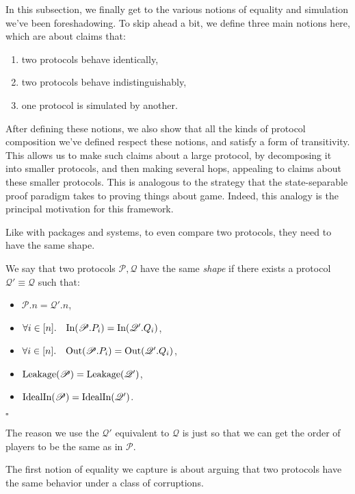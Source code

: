 In this subsection, we finally get to the various notions
of equality and simulation we've been foreshadowing.
To skip ahead a bit, we define three main notions here, which
are about claims that:
\begin{enumerate}
  \item two protocols behave identically,
  \item two protocols behave indistinguishably,
  \item one protocol is simulated by another.
\end{enumerate}
After defining these notions, we also show that all the kinds
of protocol composition we've defined respect these notions,
and satisfy a form of transitivity.
This allows us to make such claims about a large protocol,
by decomposing it into smaller protocols, and then making
several hops, appealing to claims about these smaller protocols.
This is analogous to the strategy that the state-separable proof
paradigm takes to proving things about game.
Indeed, this analogy is the principal motivation for this framework.

Like with packages and systems, to even compare two protocols,
they need to have the same shape.

\begin{definition}[Shape]
  \label{def:shape}
  We say that two protocols $\mathscr{P}, \mathscr{Q}$ have the same \emph{shape}
  if there exists a protocol $\mathscr{Q}' \equiv \mathscr{Q}$ such that:
  \begin{itemize}
    \item $\mathscr{P}.n = \mathscr{Q}'.n$,
    \item $\forall i \in [n].\quad \text{In}(\mathscr{P}.P_i) = \text{In}(\mathscr{Q}'.Q_i)$,
    \item $\forall i \in [n].\quad \text{Out}(\mathscr{P}.P_i) = \text{Out}(\mathscr{Q}'.Q_i)$,
    \item $\text{Leakage}(\mathscr{P}) = \text{Leakage}(\mathscr{Q}')$,
    \item $\text{IdealIn}(\mathscr{P}) = \text{IdealIn}(\mathscr{Q}')$.
  \end{itemize}

  $\square$
\end{definition}

The reason we use the $\mathscr{Q}'$ equivalent to $\mathscr{Q}$
is just so that we can get the order of players to be the same
as in $\mathscr{P}$.

The first notion of equality we capture is about arguing
that two protocols have the same behavior under a class of corruptions.

